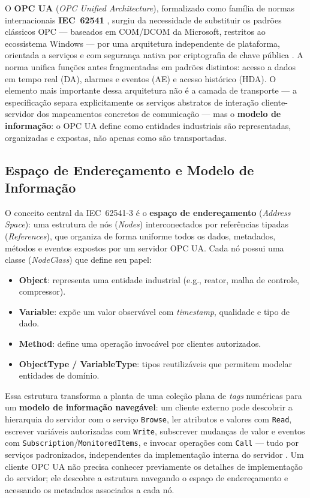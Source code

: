 O \textbf{OPC UA} (\textit{OPC Unified Architecture}), formalizado como família de normas internacionais \textbf{IEC~62541} \cite{IEC62541_1}, surgiu da necessidade de substituir os padrões clássicos OPC --- baseados em COM/DCOM da Microsoft, restritos ao ecossistema Windows --- por uma arquitetura independente de plataforma, orientada a serviços e com segurança nativa por criptografia de chave pública \cite{Mahnke2009intro}. A norma unifica funções antes fragmentadas em padrões distintos: acesso a dados em tempo real (DA), alarmes e eventos (AE) e acesso histórico (HDA). O elemento mais importante dessa arquitetura não é a camada de transporte --- a especificação separa explicitamente os serviços abstratos de interação cliente-servidor dos mapeamentos concretos de comunicação \cite{Mahnke2009services} --- mas o \textbf{modelo de informação}: o OPC UA define como entidades industriais são representadas, organizadas e expostas, não apenas como são transportadas.

\subsection{Espaço de Endereçamento e Modelo de Informação}

O conceito central da IEC~62541-3 \cite{IEC62541_3} é o \textbf{espaço de endereçamento} (\textit{Address Space}): uma estrutura de nós (\textit{Nodes}) interconectados por referências tipadas (\textit{References}), que organiza de forma uniforme todos os dados, metadados, métodos e eventos expostos por um servidor OPC UA. Cada nó possui uma classe (\textit{NodeClass}) que define seu papel:

\begin{itemize}
	\item \textbf{Object}: representa uma entidade industrial (e.g., reator, malha de controle, compressor).
	\item \textbf{Variable}: expõe um valor observável com \textit{timestamp}, qualidade e tipo de dado.
	\item \textbf{Method}: define uma operação invocável por clientes autorizados.
	\item \textbf{ObjectType / VariableType}: tipos reutilizáveis que permitem modelar entidades de domínio.
\end{itemize}

Essa estrutura transforma a planta de uma coleção plana de \textit{tags} numéricas para um \textbf{modelo de informação navegável}: um cliente externo pode descobrir a hierarquia do servidor com o serviço \texttt{Browse}, ler atributos e valores com \texttt{Read}, escrever variáveis autorizadas com \texttt{Write}, subscrever mudanças de valor e eventos com \texttt{Subscription}/\texttt{MonitoredItems}, e invocar operações com \texttt{Call} --- tudo por serviços padronizados, independentes da implementação interna do servidor \cite{Mahnke2009services}. Um cliente OPC UA não precisa conhecer previamente os detalhes de implementação do servidor; ele descobre a estrutura navegando o espaço de endereçamento e acessando os metadados associados a cada nó.

